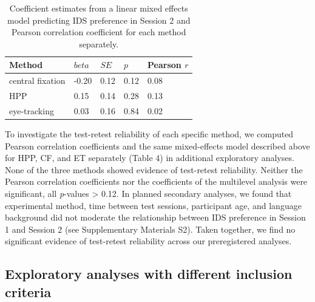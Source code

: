 \documentclass[
  man,floatsintext]{apa6}
\begin{document}
\begin{table}[tbp]

\begin{center}
\begin{threeparttable}

\caption{\label{tab:unnamed-chunk-6}Coefficient estimates from a linear mixed effects model predicting IDS preference in Session 2 and Pearson correlation coefficient for each method separately.}

\begin{tabular}{lllll}
\toprule
Method & $beta$ & $SE$ & $p$ & Pearson $r$\\
\midrule
central fixation & -0.20 & 0.12 & 0.12 & 0.08\\
HPP & 0.15 & 0.14 & 0.28 & 0.13\\
eye-tracking & 0.03 & 0.16 & 0.84 & 0.02\\
\bottomrule
\end{tabular}

\end{threeparttable}
\end{center}

\end{table}

To investigate the test-retest reliability of each specific method, we computed Pearson correlation coefficients and the same mixed-effects model described above for HPP, CF, and ET separately (Table 4) in additional exploratory analyses.
None of the three methods showed evidence of test-retest reliability.
Neither the Pearson correlation coefficients nor the coefficients of the multilevel analysis were significant, all \emph{p}-values \textgreater{} 0.12.
In planned secondary analyses, we found that experimental method, time between test sessions, participant age, and language background did not moderate the relationship between IDS preference in Session 1 and Session 2 (see Supplementary Materials S2).
Taken together, we find no significant evidence of test-retest reliability across our preregistered analyses.

\hypertarget{exploratory-analyses-with-different-inclusion-criteria}{%
\subsection{Exploratory analyses with different inclusion criteria}\label{exploratory-analyses-with-different-inclusion-criteria}}
\end{document}
